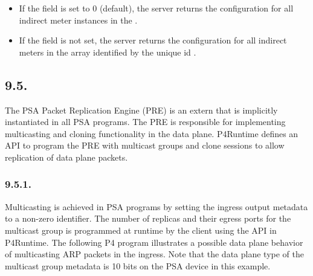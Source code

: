 \documentclass[11pt]{article}
\begin{document}
{%
\begin{itemize}%

\item{}
If the  field is set to 0 (default), the server returns the
configuration for all indirect meter instances in the .%

\item{}
If the  field is not set, the server returns the configuration for all
indirect meters in the array identified by the unique id .%
\end{itemize}%

\subsection{9.5.\hspace*{0.5em}}\label{sec-packetreplicationengineentry}%

\noindent{}The PSA Packet Replication Engine (PRE) is an extern that is implicitly
instantiated in all PSA programs. The PRE is responsible for implementing
multicasting and cloning functionality in the data plane. P4Runtime defines an
API to program the PRE with multicast groups and clone sessions to allow
replication of data plane packets.%

\subsubsection{9.5.1.\hspace*{0.5em}}\label{sec-multicastgroupentry}%

\noindent{}Multicasting is achieved in PSA programs by setting the 
ingress output metadata to a non-zero identifier. The number of replicas and
their egress ports for the multicast group is programmed at runtime by the
client using the  API in P4Runtime. The following P4
program illustrates a possible data plane behavior of multicasting ARP packets
in the ingress. Note that the data plane type of the multicast group metadata is
10 bits on the PSA device in this example.%

}
\end{document}

